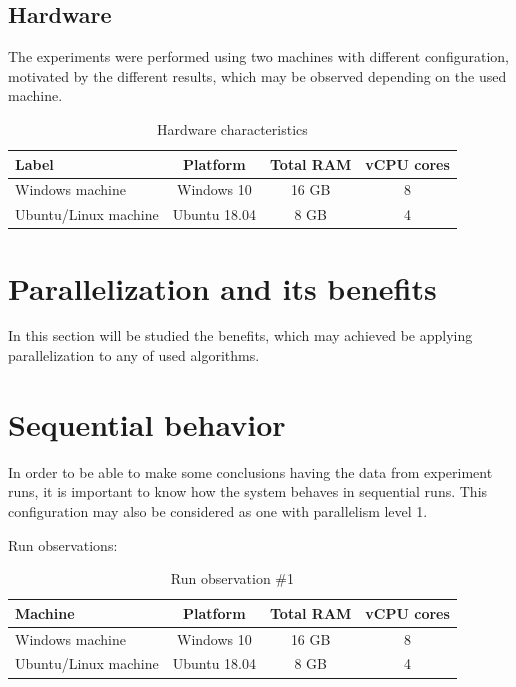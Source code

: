 \subsection{Hardware}

The experiments were performed using two machines with different configuration, motivated by the different results, which may be observed depending on the used machine.

\begin{table}[h]
\centering\caption{Hardware characteristics \label{tab:exp-hardware}}
\begin{tabular}{|l|c|c|c|}%
\hline
\textbf{Label} & \textbf{Platform} & \textbf{Total RAM} & \textbf{vCPU cores} \\
\hline
Windows machine & Windows 10 & 16 GB & 8 \\
\hline
Ubuntu/Linux machine & Ubuntu 18.04 & 8 GB & 4 \\
\hline
\end{tabular}
\end{table}

\section{Parallelization and its benefits}
In this section will be studied the benefits, which may achieved be applying parallelization to any of used algorithms.

\section{Sequential behavior}

In order to be able to make some conclusions having the data from experiment runs, it is important to know how the system behaves in sequential runs. This configuration may also be considered as one with parallelism level 1.

Run observations:
\begin{table}[h]
\centering\caption{Run observation \#1 \label{tab:run-1}}
\begin{tabular}{|l|c|c|c|}%
\hline
\textbf{Machine} & \textbf{Platform} & \textbf{Total RAM} & \textbf{vCPU cores} \\
\hline
Windows machine & Windows 10 & 16 GB & 8 \\
\hline
Ubuntu/Linux machine & Ubuntu 18.04 & 8 GB & 4 \\
\hline
\end{tabular}
\end{table}

